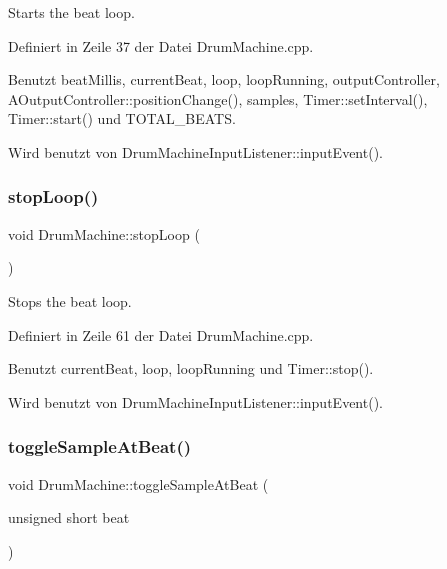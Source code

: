 Starts the beat loop. 

Definiert in Zeile 37 der Datei Drum\+Machine.\+cpp.



Benutzt beat\+Millis, current\+Beat, loop, loop\+Running, output\+Controller, A\+Output\+Controller\+::position\+Change(), samples, Timer\+::set\+Interval(), Timer\+::start() und T\+O\+T\+A\+L\+\_\+\+B\+E\+A\+TS.



Wird benutzt von Drum\+Machine\+Input\+Listener\+::input\+Event().

\mbox{\label{class_drum_machine_af1564a42f1c2717534a61437617070b3}} 
\subsubsection{\texorpdfstring{stop\+Loop()}{stopLoop()}}
{\footnotesize\ttfamily void Drum\+Machine\+::stop\+Loop (\begin{DoxyParamCaption}{ }\end{DoxyParamCaption})}

Stops the beat loop. 

Definiert in Zeile 61 der Datei Drum\+Machine.\+cpp.



Benutzt current\+Beat, loop, loop\+Running und Timer\+::stop().



Wird benutzt von Drum\+Machine\+Input\+Listener\+::input\+Event().

\mbox{\label{class_drum_machine_ac34e64779cd419a75628630f71a3041b}} 
\subsubsection{\texorpdfstring{toggle\+Sample\+At\+Beat()}{toggleSampleAtBeat()}}
{\footnotesize\ttfamily void Drum\+Machine\+::toggle\+Sample\+At\+Beat (\begin{DoxyParamCaption}\item[{unsigned short}]{beat }\end{DoxyParamCaption})}

